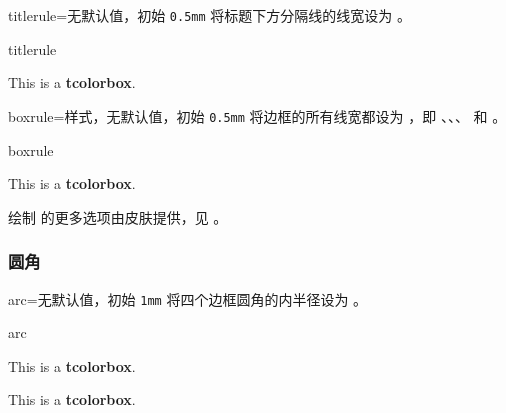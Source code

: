 \clearpage
\begin{docTcbKey}{titlerule}{=}{无默认值，初始 \texttt{0.5mm}}
  将标题下方分隔线的线宽设为 。
\begin{exdispExample}{titlerule}

\begin{tcolorbox}[titlerule=3mm,title=This is the title]
This is a \textbf{tcolorbox}.
\end{tcolorbox}
\end{exdispExample}
\end{docTcbKey}


\begin{docTcbKey}{boxrule}{=}{样式，无默认值，初始 \texttt{0.5mm}}
  将边框的所有线宽都设为 ，即
  、、、
   和 。
\begin{exdispExample}{boxrule}

\begin{tcolorbox}[boxrule=3mm]
This is a \textbf{tcolorbox}.
\end{tcolorbox}
\end{exdispExample}
\end{docTcbKey}

\bigskip
\begin{marker}
  绘制  的更多选项由皮肤提供，见 。
\end{marker}


\subsubsection{圆角}
\begin{docTcbKey}{arc}{=}{无默认值，初始 \texttt{1mm}}
  将四个边框圆角的内半径设为 。
\begin{exdispExample}{arc}

\begin{tcolorbox}[arc=0mm]
This is a \textbf{tcolorbox}.
\end{tcolorbox}
\begin{tcolorbox}[arc=3mm]
This is a \textbf{tcolorbox}.
\end{tcolorbox}
\end{exdispExample}
\end{docTcbKey}


